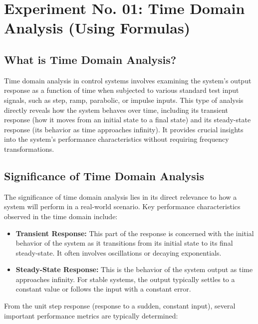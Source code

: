 \documentclass{article}
\begin{document}
	
	\section*{Experiment No. 01: Time Domain Analysis (Using Formulas)}
	
	\subsection*{What is Time Domain Analysis?}
	
	Time domain analysis in control systems involves examining the system's output response as a function of time when subjected to various standard test input signals, such as step, ramp, parabolic, or impulse inputs. This type of analysis directly reveals how the system behaves over time, including its transient response (how it moves from an initial state to a final state) and its steady-state response (its behavior as time approaches infinity). It provides crucial insights into the system's performance characteristics without requiring frequency transformations.
	
	\subsection*{Significance of Time Domain Analysis}
	
	The significance of time domain analysis lies in its direct relevance to how a system will perform in a real-world scenario. Key performance characteristics observed in the time domain include:
	
	\begin{itemize}
		\item \textbf{Transient Response:} This part of the response is concerned with the initial behavior of the system as it transitions from its initial state to its final steady-state. It often involves oscillations or decaying exponentials.
		\item \textbf{Steady-State Response:} This is the behavior of the system output as time approaches infinity. For stable systems, the output typically settles to a constant value or follows the input with a constant error.
	\end{itemize}
	
	From the unit step response (response to a sudden, constant input), several important performance metrics are typically determined:
	
\end{document}
